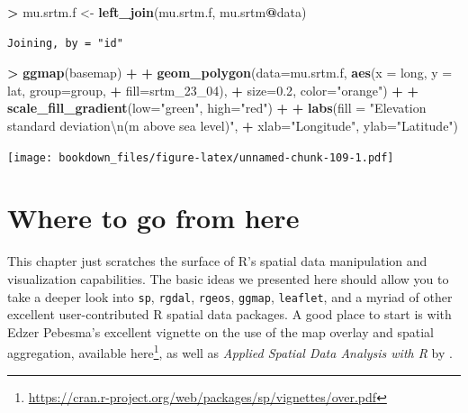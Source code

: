 \documentclass[]{krantz}
\makeatletter
\newenvironment{Shaded}{\begin{snugshade}}{\end{snugshade}}
\newcommand{\CharTok}[1]{\textcolor[rgb]{0.5,0.5,0.5}{#1}}
\newcommand{\DataTypeTok}[1]{\textcolor[rgb]{0.27,0.27,0.27}{#1}}
\newcommand{\DecValTok}[1]{\textcolor[rgb]{0.06,0.06,0.06}{#1}}
\newcommand{\FloatTok}[1]{\textcolor[rgb]{0.06,0.06,0.06}{#1}}
\newcommand{\KeywordTok}[1]{\textcolor[rgb]{0.27,0.27,0.27}{\textbf{#1}}}
\newcommand{\NormalTok}[1]{#1}
\newcommand{\OperatorTok}[1]{\textcolor[rgb]{0.43,0.43,0.43}{\textbf{#1}}}
\newcommand{\StringTok}[1]{\textcolor[rgb]{0.5,0.5,0.5}{#1}}
\renewcommand{\href}[2]{#2\footnote{\url{#1}}}
\newenvironment{kframe}{%
\medskip{}
\setlength{\fboxsep}{.8em}
 \def\at@end@of@kframe{}%
 \ifinner\ifhmode%
  \def\at@end@of@kframe{\end{minipage}}%
  \begin{minipage}{\columnwidth}%
 \fi\fi%
 \def\FrameCommand##1{\hskip\@totalleftmargin \hskip-\fboxsep
 \colorbox{shadecolor}{##1}\hskip-\fboxsep
     \hskip-\linewidth \hskip-\@totalleftmargin \hskip\columnwidth}%
 \MakeFramed {\advance\hsize-\width
   \@totalleftmargin\z@ \linewidth\hsize
   \@setminipage}}%
 {\par\unskip\endMakeFramed%
 \at@end@of@kframe}
\renewenvironment{Shaded}{\begin{kframe}}{\end{kframe}}
\makeatother
\begin{document}
\begin{Shaded}
\begin{Highlighting}[]
\OperatorTok{>}\StringTok{ }\NormalTok{mu.srtm.f <-}\StringTok{ }\KeywordTok{left_join}\NormalTok{(mu.srtm.f, mu.srtm}\OperatorTok{@}\NormalTok{data)}
\end{Highlighting}
\end{Shaded}

\begin{verbatim}
Joining, by = "id"
\end{verbatim}

\begin{Shaded}
\begin{Highlighting}[]
\OperatorTok{>}\StringTok{ }\KeywordTok{ggmap}\NormalTok{(basemap) }\OperatorTok{+}
\OperatorTok{+}\StringTok{     }\KeywordTok{geom_polygon}\NormalTok{(}\DataTypeTok{data=}\NormalTok{mu.srtm.f, }\KeywordTok{aes}\NormalTok{(}\DataTypeTok{x =}\NormalTok{ long, }\DataTypeTok{y =}\NormalTok{ lat, }\DataTypeTok{group=}\NormalTok{group, }
\OperatorTok{+}\StringTok{                                      }\DataTypeTok{fill=}\NormalTok{srtm_}\DecValTok{23}\NormalTok{_}\DecValTok{04}\NormalTok{), }
\OperatorTok{+}\StringTok{                  }\DataTypeTok{size=}\FloatTok{0.2}\NormalTok{, }\DataTypeTok{color=}\StringTok{"orange"}\NormalTok{) }\OperatorTok{+}
\OperatorTok{+}\StringTok{     }\KeywordTok{scale_fill_gradient}\NormalTok{(}\DataTypeTok{low=}\StringTok{"green"}\NormalTok{, }\DataTypeTok{high=}\StringTok{"red"}\NormalTok{) }\OperatorTok{+}
\OperatorTok{+}\StringTok{         }\KeywordTok{labs}\NormalTok{(}\DataTypeTok{fill =} \StringTok{"Elevation standard deviation}\CharTok{\textbackslash{}n}\StringTok{(m above sea level)"}\NormalTok{, }
\OperatorTok{+}\StringTok{          }\DataTypeTok{xlab=}\StringTok{"Longitude"}\NormalTok{, }\DataTypeTok{ylab=}\StringTok{"Latitude"}\NormalTok{)}
\end{Highlighting}
\end{Shaded}

\texttt{[image: bookdown\_files/figure-latex/unnamed-chunk-109-1.pdf]}

\hypertarget{where-to-go-from-here}{%
\section{Where to go from here}\label{where-to-go-from-here}}

This chapter just scratches the surface of R's spatial data manipulation and visualization capabilities. The basic ideas we presented here should allow you to take a deeper look into \texttt{sp}, \texttt{rgdal}, \texttt{rgeos}, \texttt{ggmap}, \texttt{leaflet}, and a myriad of other excellent user-contributed R spatial data packages. A good place to start is with Edzer Pebesma's excellent vignette on the use of the map overlay and spatial aggregation, available \href{https://cran.r-project.org/web/packages/sp/vignettes/over.pdf}{here}, as well as \emph{Applied Spatial Data Analysis with R} by \cite{Bivand13}.



\backmatter
\printindex
\end{document}
